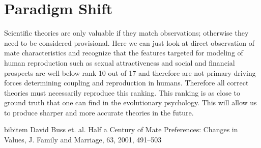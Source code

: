 \documentclass{article}
\begin{document}
\section{Paradigm Shift}
Scientific theories are only valuable if they match observations; otherwise they need to be considered provisional.  Here we can just look at direct observation of mate characteristics and recognize that the features targeted for modeling of human reproduction such as sexual attractiveness and social and financial prospects are well below rank 10 out of 17 and therefore are not primary driving forces determining coupling and reproduction in humans.  Therefore all correct theories must necessarily reproduce this ranking.  This ranking is as close to ground truth that one can find in the evolutionary psychology.  This will allow us to produce sharper and more accurate theories in the future.

\begin{thebibliography}
 bibitem David Buss et. al. Half a Century of Mate Preferences: Changes in Values, J. Family and Marriage, 63, 2001, 491--503
\end{thebibliography}
\end{document}
